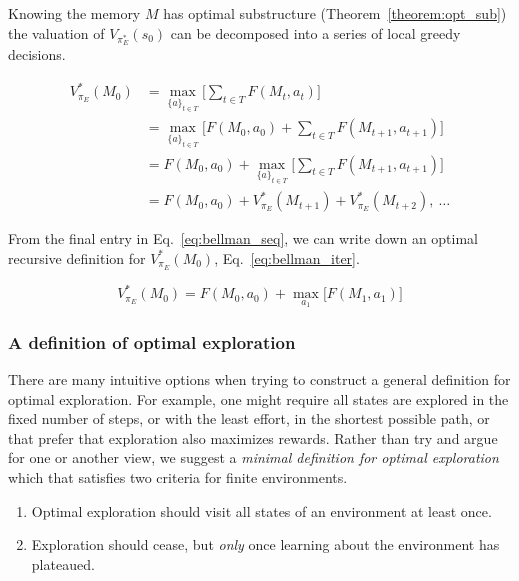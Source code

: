 \documentclass[9pt,twocolumn,twoside]{pnas-new}
\begin{document}
Knowing the memory $M$ has optimal substructure (Theorem~\ref{theorem:opt_sub}) the valuation of $V_{\pi_E^*}(s_0)$ can be decomposed into a series of local greedy decisions.

\begin{equation} \label{eq:bellman_seq}
    \begin{split}
        V^*_{\pi_E}(M_0) &= \max_{\{a\}_{t \in T}} \Big [\sum_{t \in T} F(M_t, a_t)\Big ]\\
                         &= \max_{\{a\}_{t \in T}} \Big [F(M_0, a_0) + \sum_{t \in T}F(M_{t+1}, a_{t+1})\Big ]\\
                         &= F(M_0, a_0) + \max_{\{a\}_{t \in T}} \Big [\sum_{t \in T} F(M_{t+1}, a_{t+1}) \Big ]\\
                         &= F(M_0, a_0) + V^*_{\pi_E}(M_{t+1}) + V^*_{\pi_E}(M_{t+2}),\ \ldots
    \end{split}
\end{equation}

From the final entry in Eq.~\ref{eq:bellman_seq}, we can write down an optimal recursive definition for $V^*_{\pi_E}(M_0)$, Eq.~\ref{eq:bellman_iter}.

\begin{equation} \label{eq:bellman_iter}
    V^*_{\pi_E}(M_0) = F(M_0, a_0) + \max_{a_1} \Big [F(M_1, a_1) \Big ]
\end{equation}
    

\subsubsection*{A definition of optimal exploration}
There are many intuitive options when trying to construct a general definition for optimal exploration. For example, one might require all states are explored in the fixed number of steps, or with the least effort, in the shortest possible path, or that prefer that exploration also maximizes rewards. Rather than try and argue for one or another view, we suggest a \textit{minimal definition for optimal exploration} which that satisfies two criteria for finite environments. 

\begin{enumerate}[noitemsep,wide=0pt,leftmargin=\dimexpr\labelwidth+2\labelsep\relax]
    \item Optimal exploration should visit all states of an environment at least once. 
    \item Exploration should cease, but \textit{only} once learning about the environment has plateaued. 
\end{enumerate}
\end{document}
